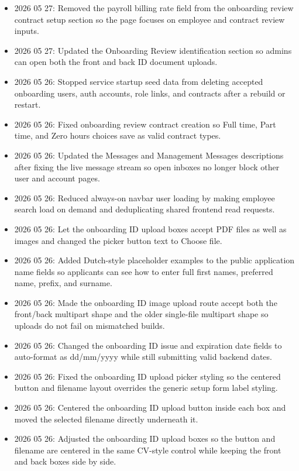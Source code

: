 \documentclass[11pt]{article}
\begin{document}
\begin{itemize}
    \item 2026 05 27: Removed the payroll billing rate field from the onboarding review contract setup section so the page focuses on employee and contract review inputs.
    \item 2026 05 27: Updated the Onboarding Review identification section so admins can open both the front and back ID document uploads.
    \item 2026 05 26: Stopped service startup seed data from deleting accepted onboarding users, auth accounts, role links, and contracts after a rebuild or restart.
    \item 2026 05 26: Fixed onboarding review contract creation so Full time, Part time, and Zero hours choices save as valid contract types.
    \item 2026 05 26: Updated the Messages and Management Messages descriptions after fixing the live message stream so open inboxes no longer block other user and account pages.
    \item 2026 05 26: Reduced always-on navbar user loading by making employee search load on demand and deduplicating shared frontend read requests.
    \item 2026 05 26: Let the onboarding ID upload boxes accept PDF files as well as images and changed the picker button text to Choose file.
    \item 2026 05 26: Added Dutch-style placeholder examples to the public application name fields so applicants can see how to enter full first names, preferred name, prefix, and surname.
    \item 2026 05 26: Made the onboarding ID image upload route accept both the front/back multipart shape and the older single-file multipart shape so uploads do not fail on mismatched builds.
    \item 2026 05 26: Changed the onboarding ID issue and expiration date fields to auto-format as dd/mm/yyyy while still submitting valid backend dates.
    \item 2026 05 26: Fixed the onboarding ID upload picker styling so the centered button and filename layout overrides the generic setup form label styling.
    \item 2026 05 26: Centered the onboarding ID upload button inside each box and moved the selected filename directly underneath it.
    \item 2026 05 26: Adjusted the onboarding ID upload boxes so the button and filename are centered in the same CV-style control while keeping the front and back boxes side by side.

\end{itemize}
\end{document}
